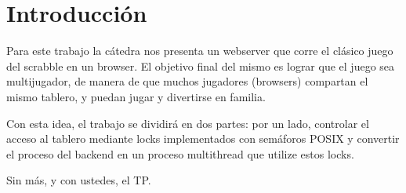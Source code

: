 \section{Introducción}

Para este trabajo la cátedra nos presenta un webserver que corre el clásico juego del scrabble en un browser. El objetivo final del mismo es lograr que el juego sea multijugador, de manera de que muchos jugadores (browsers) compartan el mismo tablero, y puedan jugar y divertirse en familia.

Con esta idea, el trabajo se dividirá en dos partes: por un lado, controlar el acceso al tablero mediante locks implementados con semáforos POSIX y convertir el proceso del backend en un proceso multithread que utilize estos locks.

Sin más, y con ustedes, el TP.